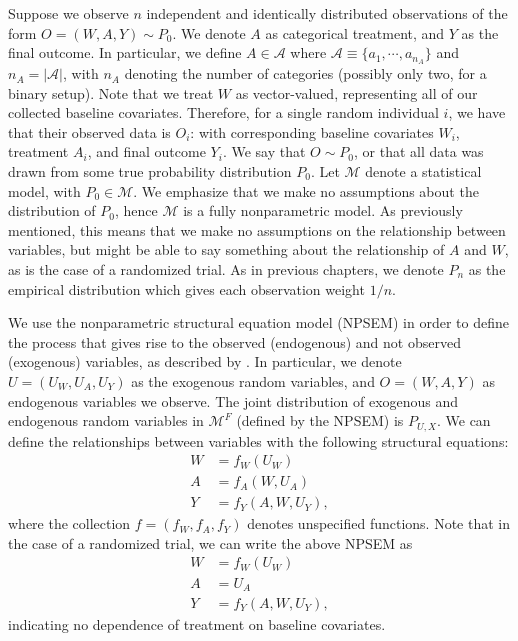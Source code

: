 \documentclass[12pt, krantz2,]{krantz}
\theoremstyle{definition}
\theoremstyle{definition}
\theoremstyle{definition}
\newcommand{\1}{\mathbbm{1}}
\begin{document}
Suppose we observe \(n\) independent and identically distributed observations of
the form \(O=(W,A,Y) \sim P_0\). We denote \(A\) as categorical treatment, and \(Y\)
as the final outcome. In particular, we define \(A \in \mathcal{A}\) where
\(\mathcal{A} \equiv \{a_1, \cdots, a_{n_A} \}\) and \(n_A = |\mathcal{A}|\), with
\(n_A\) denoting the number of categories (possibly only two, for a binary setup).
Note that we treat \(W\) as vector-valued, representing all of our collected
baseline covariates. Therefore, for a single random individual \(i\), we have that
their observed data is \(O_i\): with corresponding baseline covariates \(W_i\),
treatment \(A_i\), and final outcome \(Y_i\). We say that \(O \sim P_0\), or that all
data was drawn from some true probability distribution \(P_0\). Let \(\mathcal{M}\)
denote a statistical model, with \(P_0 \in \mathcal{M}\). We emphasize that we
make no assumptions about the distribution of \(P_0\), hence \(\mathcal{M}\) is a
fully nonparametric model. As previously mentioned, this means that we make no
assumptions on the relationship between variables, but might be able to say
something about the relationship of \(A\) and \(W\), as is the case of a randomized
trial. As in previous chapters, we denote \(P_n\) as the empirical distribution
which gives each observation weight \(1/n\).

We use the nonparametric structural equation model (NPSEM) in order to define
the process that gives rise to the observed (endogenous) and not observed
(exogenous) variables, as described by \citet{pearl2009causality}. In particular, we
denote \(U=(U_W,U_A,U_Y)\) as the exogenous random variables, and \(O=(W,A,Y)\) as
endogenous variables we observe. The joint distribution of exogenous and
endogenous random variables in \(\mathcal{M}^F\) (defined by the NPSEM) is
\(P_{U,X}\). We can define the relationships between variables with the following
structural equations:
\begin{align}
  W &= f_W(U_W) \\ A &= f_A(W, U_A) \\ Y &= f_Y(A, W, U_Y),
  \label{eq:npsem-mopttx}
\end{align}
where the collection \(f=(f_W,f_A,f_Y)\) denotes unspecified functions. Note that
in the case of a randomized trial, we can write the above NPSEM as
\begin{align}
  W &= f_W(U_W) \\ A &= U_A \\ Y &= f_Y(A, W, U_Y),
  \label{eq:npsem-rt-mopttx}
\end{align}
indicating no dependence of treatment on baseline covariates.
\end{document}
